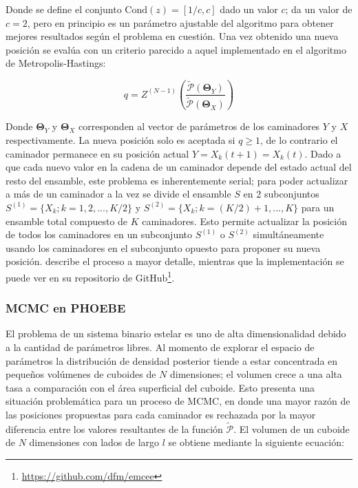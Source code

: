 Donde se define el conjunto $\mathrm{Cond}(z) = [1/c, c]$ dado un valor $c$;
da un valor de $c = 2$, pero en principio es un parámetro ajustable del
algoritmo para obtener mejores resultados según el problema en cuestión. Una vez
obtenido una nueva posición se evalúa con un criterio parecido a aquel
implementado en el algoritmo de Metropolis-Hastings:

\newpage

\begin{eqfloat}[!ht]
	\centering
	\begin{equation}
		q = Z^{(N - 1)} \left(\frac{\tilde{\mathcal{P}}(\mathbf{\Theta}_Y)}{\tilde{\mathcal{P}}(\mathbf{\Theta}_X)}\right)
	\end{equation}
\end{eqfloat}

Donde $\mathbf{\Theta}_Y$ y $\mathbf{\Theta}_X$ corresponden al vector de
parámetros de los caminadores $Y$ y $X$ respectivamente. La nueva posición solo
es aceptada si $q \geq 1$, de lo contrario el caminador permanece en su posición
actual $Y = X_{k}(t + 1) = X_{k}(t)$. Dado a que cada nuevo valor en la cadena
de un caminador depende del estado actual del resto del ensamble, este problema
es inherentemente serial; para poder actualizar a más de un caminador a la vez
se divide el ensamble $S$ en 2 subconjuntos $S^{(1)} = \{ X_k; k = 1, 2, ...,
K/2 \}$ y $S^{(2)} = \{ X_k; k = (K/2) + 1, ..., K \}$ para un ensamble total
compuesto de $K$ caminadores. Esto permite actualizar la posición de todos los
caminadores en un subconjunto $S^{(1)}$ o $S^{(2)}$ simultáneamente usando los
caminadores en el subconjunto opuesto para proponer su nueva posición.
 describe el proceso a mayor detalle,
mientras que la implementación se puede ver en su repositorio de
GitHub\footnote{\url{https://github.com/dfm/emcee}}.

\subsubsection{MCMC en PHOEBE}

El problema de un sistema binario estelar es uno de alta dimensionalidad debido
a la cantidad de parámetros libres. Al momento de explorar el espacio de
parámetros la distribución de densidad posterior tiende a estar concentrada en
pequeños volúmenes de cuboides de $N$ dimensiones; el volumen crece a una alta
tasa a comparación con el área superficial del cuboide. Esto presenta una
situación problemática para un proceso de MCMC, en donde una mayor razón de las
posiciones propuestas para cada caminador es rechazada por la mayor diferencia
entre los valores resultantes de la función $\tilde{\mathcal{P}}$. El volumen de
un cuboide de $N$ dimensiones con lados de largo $l$ se obtiene mediante la
siguiente ecuación:

